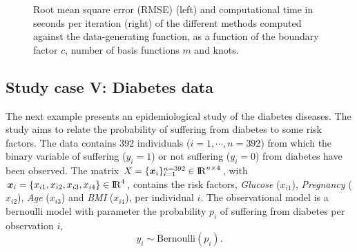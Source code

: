 \documentclass[]{interact}
\theoremstyle{plain}%
\theoremstyle{definition}
\theoremstyle{remark}
\begin{document}
\begin{figure}
\caption{Root mean square error (RMSE) (left) and computational time in seconds per iteration (right) of the different methods computed against the data-generating function, as a function of the boundary factor $c$, number of basis functions $m$ and knots.}
  \label{fig17_RMSE_exII}
\end{figure}


\subsection{Study case V: Diabetes data}\label{sec:bf_caseV}
The next example presents an epidemiological study of the diabetes diseases. The study aims to relate the probability of suffering from diabetes to some risk factors. The data contains 392 individuals ($i=1,\cdots,n=392$) from which the binary variable of suffering ($y_i=1$) or not suffering ($y_i=0$) from diabetes have been observed. The matrix $X=\{\bm{x}_i\}_{i=1}^{n=392} \in {\rm I\!R}^{n\times 4}$,  with $\bm{x}_i=\{x_{i1},x_{i2},x_{i3},x_{i4}\} \in {\rm I\!R}^{4}$, contains the risk factors, \textit{Glucose} ($x_{i1}$), \textit{Pregnancy} ($x_{i2}$), \textit{Age} ($x_{i3}$) and \textit{BMI} ($x_{i4}$), per individual $i$. The observational model is a bernoulli model with parameter the probability $p_i$ of suffering from diabetes per observation $i$,
%
\begin{equation*}
y_i \sim \text{Bernoulli}(p_i).
\end{equation*}
\end{document}
